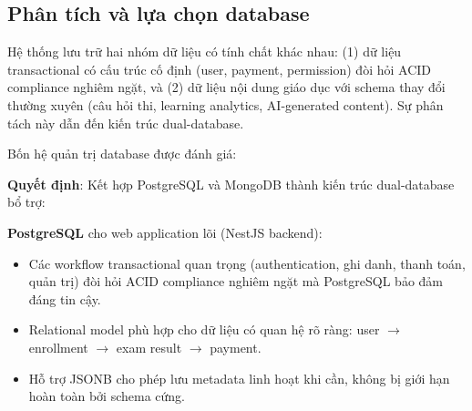 \subsection{Phân tích và lựa chọn database}

Hệ thống lưu trữ hai nhóm dữ liệu có tính chất khác nhau: (1) dữ liệu transactional có cấu trúc cố định (user, payment, permission) đòi hỏi ACID compliance nghiêm ngặt, và (2) dữ liệu nội dung giáo dục với schema thay đổi thường xuyên (câu hỏi thi, learning analytics, AI-generated content). Sự phân tách này dẫn đến kiến trúc dual-database.

Bốn hệ quản trị database được đánh giá:

\begin{table}[H]
    \centering
    \caption{So sánh database theo yêu cầu dự án}
    \label{tab:db_comparison}
    \scriptsize
\end{table}

\textbf{Quyết định}: Kết hợp PostgreSQL và MongoDB thành kiến trúc dual-database bổ trợ:

\textbf{PostgreSQL} cho web application lõi (NestJS backend):
\begin{itemize}
\item Các workflow transactional quan trọng (authentication, ghi danh, thanh toán, quản trị) đòi hỏi ACID compliance nghiêm ngặt mà PostgreSQL bảo đảm đáng tin cậy.
\item Relational model phù hợp cho dữ liệu có quan hệ rõ ràng: user $\rightarrow$ enrollment $\rightarrow$ exam result $\rightarrow$ payment.
\item Hỗ trợ JSONB cho phép lưu metadata linh hoạt khi cần, không bị giới hạn hoàn toàn bởi schema cứng. \cite{postgresql}
\end{itemize}

